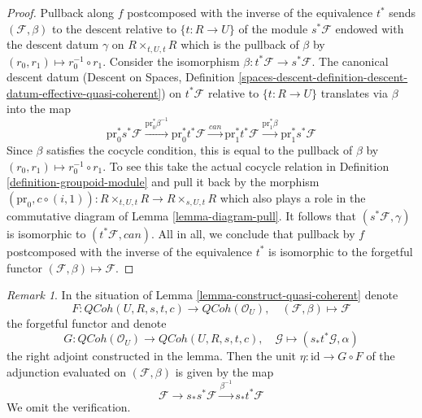 \documentclass{stacks-project}
\theoremstyle{plain}
\theoremstyle{definition}
\theoremstyle{remark}
\newtheorem{remark}[subsection]{Remark}
\numberwithin{equation}{subsection}
\def\QCoh{\mathit{QCoh}}
\begin{document}
\begin{proof}
\medskip\noindent
Pullback along $f$ postcomposed with the inverse of the equivalence $t^*$
sends $(\mathcal{F}, \beta)$ to the descent relative to $\{t : R \to U\}$
of the module $s^*\mathcal{F}$ endowed with the descent datum $\gamma$ on
$R \times_{t, U, t} R$ which is the pullback of $\beta$ by
$(r_0, r_1) \mapsto r_0^{-1} \circ r_1$.
Consider the isomorphism $\beta : t^*\mathcal{F} \to s^*\mathcal{F}$.
The canonical descent datum (Descent on Spaces, Definition
\ref{spaces-descent-definition-descent-datum-effective-quasi-coherent})
on $t^*\mathcal{F}$ relative to $\{t : R \to U\}$
translates via $\beta$ into the map
$$
\text{pr}_0^*s^*\mathcal{F}
\xrightarrow{\text{pr}_0^*\beta^{-1}}
\text{pr}_0^*t^*\mathcal{F}
\xrightarrow{can}
\text{pr}_1^*t^*\mathcal{F}
\xrightarrow{\text{pr}_1^*\beta}
\text{pr}_1^*s^*\mathcal{F}
$$
Since $\beta$ satisfies the cocycle condition, this is equal to the pullback
of $\beta$ by $(r_0, r_1) \mapsto r_0^{-1} \circ r_1$. To see this
take the actual cocycle relation in Definition \ref{definition-groupoid-module}
and pull it back by the morphism
$(\text{pr}_0, c \circ (i, 1)) : R \times_{t, U, t} R \to R \times_{s, U, t} R$
which also plays a role in the commutative diagram of
Lemma \ref{lemma-diagram-pull}. It follows that
$(s^*\mathcal{F}, \gamma)$ is isomorphic to $(t^*\mathcal{F}, can)$.
All in all, we conclude that pullback by $f$ postcomposed with the
inverse of the equivalence $t^*$ is isomorphic to the forgetful functor
$(\mathcal{F}, \beta) \mapsto \mathcal{F}$.
\end{proof}

\begin{remark}
\label{remark-adjunction-map}
In the situation of Lemma \ref{lemma-construct-quasi-coherent} denote
$$
F : \QCoh(U, R, s, t, c) \to \QCoh(\mathcal{O}_U),\quad
(\mathcal{F}, \beta) \mapsto \mathcal{F}
$$
the forgetful functor and denote
$$
G : \QCoh(\mathcal{O}_U) \to \QCoh(U, R, s, t, c),\quad
\mathcal{G} \mapsto (s_*t^*\mathcal{G}, \alpha)
$$
the right adjoint constructed in the lemma. Then the unit
$\eta : \text{id} \to G \circ F$ of the adjunction evaluated
on $(\mathcal{F}, \beta)$ is given by the map
$$
\mathcal{F} \to s_*s^*\mathcal{F} \xrightarrow{\beta^{-1}} s_*t^*\mathcal{F}
$$
We omit the verification.
\end{remark}
\end{document}
